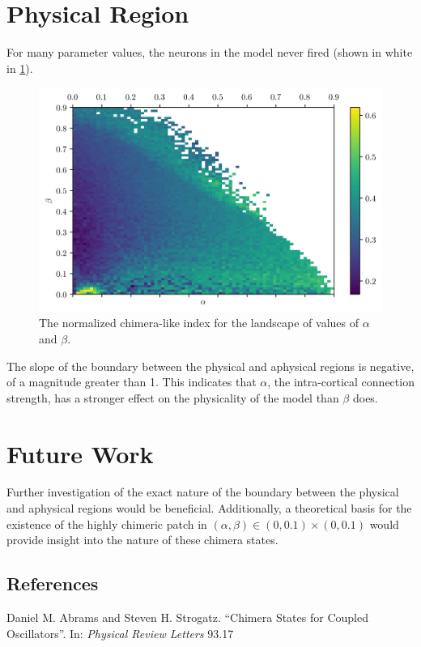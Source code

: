 \documentclass{beamer}
\newcommand{\hra}{\alpha}
\newcommand{\hrb}{\beta}
\begin{document}
\begin{frame}[t]
\begin{multicols}{3}
    \section{Physical Region}
    For many parameter values, the neurons in the model never fired (shown in white in \cref{fig:landscape}).
    \begin{figure}
      \centering
    \includegraphics[width=\columnwidth]{figure/landscape}
      \caption{The normalized chimera-like index for the landscape of values of $\hra$ and $\hrb$.}
      \label{fig:landscape}
    \end{figure}
    The slope of the boundary between the physical and aphysical regions is negative, of a magnitude greater than 1.
    This indicates that $\hra$, the intra-cortical connection strength, has a stronger effect on the physicality of the model than $\hrb$ does.

    \section{Future Work}
    Further investigation of the exact nature of the boundary between the physical and aphysical regions would be beneficial.
    Additionally, a theoretical basis for the existence of the highly chimeric patch in
    $(\hra, \hrb) \in (0, 0.1) \times (0, 0.1)$
    would provide insight into the nature of these chimera states.


    \subsection{References}
    \begin{thebibliography}{99}
     Daniel M. Abrams and Steven H. Strogatz. ``Chimera States for Coupled Oscillators''.
      In: \textit{Physical Review Letters} 93.17


\end{thebibliography}
\end{multicols}
\end{frame}
\end{document}
